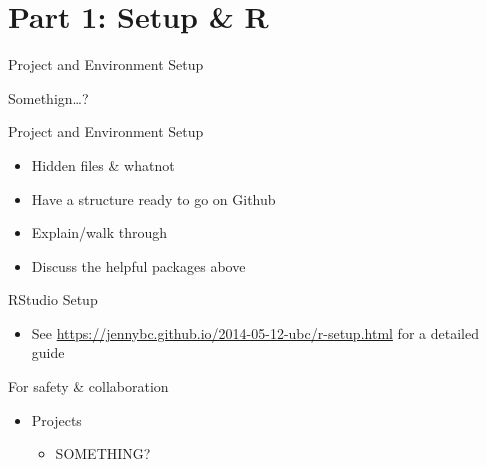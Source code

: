 \documentclass[
  ignorenonframetext,
]{beamer}
\providecommand{\tightlist}{%
  \setlength{\itemsep}{0pt}\setlength{\parskip}{0pt}}
\begin{document}
\hypertarget{part-1-setup-r}{%
\section{Part 1: Setup \& R}\label{part-1-setup-r}}

\begin{frame}{Project and Environment Setup}
\protect\hypertarget{project-and-environment-setup}{}

Somethign\ldots{}?

\end{frame}

\begin{frame}{Project and Environment Setup}
\protect\hypertarget{project-and-environment-setup-1}{}

\begin{itemize}
\tightlist
\item
  Hidden files \& whatnot
\item
  Have a structure ready to go on Github
\item
  Explain/walk through
\item
  Discuss the helpful packages above
\end{itemize}

\end{frame}

\begin{frame}{RStudio Setup}
\protect\hypertarget{rstudio-setup}{}

\begin{itemize}
\tightlist
\item
  See \url{https://jennybc.github.io/2014-05-12-ubc/r-setup.html} for a
  detailed guide
\end{itemize}

\end{frame}

\begin{frame}{For safety \& collaboration}
\protect\hypertarget{for-safety-collaboration}{}

\begin{itemize}
\tightlist
\item
  Projects

  \begin{itemize}
  \tightlist
  \item
    SOMETHING?
  \end{itemize}
\end{itemize}

\end{frame}
\end{document}
